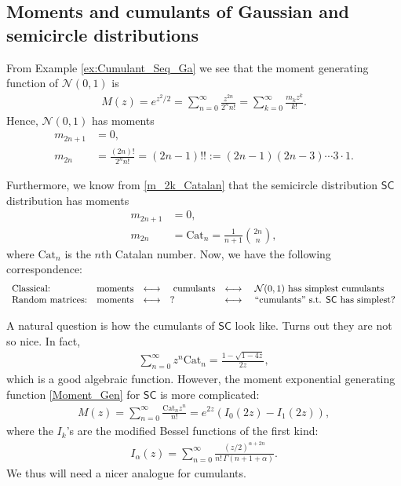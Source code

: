 \documentclass[letterpaper,11pt,oneside,reqno]{amsart}
\numberwithin{equation}{section}
\newcommand{\SC}{\mathsf{SC}}
\theoremstyle{definition}
\begin{document}

\subsection{Moments and cumulants of Gaussian and semicircle distributions} %
\label{sub:moments_and_cumulants_of_gaussian_and_semicircle_distributions}

From Example \ref{ex:Cumulant_Seq_Ga} we see that 
the moment generating function of $\mathcal{N}(0,1)$ is 
\begin{align*}
    M(z)=e^{z^2/2}=\sum_{n=0}^\infty \frac{z^{2n}}{2^nn!}=\sum_{k=0}^\infty \frac{m_k z^k}{k!}.
\end{align*}
Hence, $\mathcal{N}(0,1)$ has moments
\begin{align*}
    m_{2n+1} &=0,\\
    m_{2n}& = \frac{(2n)!}{2^nn!}=(2n-1)!!:=(2n-1)(2n-3)\cdots 3\cdot 1.
\end{align*}

Furthermore, we know from \eqref{m_2k_Catalan} that the semicircle distribution $\SC$ distribution has moments 
\begin{align*}
    m_{2n+1} &=0,\\
    m_{2n}& = \mathrm{Cat}_n=\frac{1}{n+1} {{2n}\choose{n}},
\end{align*}
where $\mathrm{Cat}_n$ is the $n$th Catalan number.
Now, we have the following correspondence:
\begin{equation*}
\begin{array}{llclcl}
\text{Classical:} &  \text{moments} & \longleftrightarrow &\  \text{cumulants} &\longleftrightarrow & \ \mathcal{N}(0,1) \ \text{has simplest cumulants}\\
\text{Random matrices:} & \text{moments} & \longleftrightarrow & ? &\longleftrightarrow &  \ \textnormal{``cumulants'' s.t. $\SC$ has simplest?}\\
\end{array}	
\end{equation*}

A natural question is how the cumulants of $\SC$ look like. Turns out they are not so nice. In fact, 
\begin{align*}
    \sum_{n=0}^\infty z^n \mathrm{Cat}_n=\frac{1-\sqrt{1-4z}}{2z},
\end{align*}
which is a good algebraic function. However, the moment exponential generating function
\eqref{Moment_Gen} 
for $\SC$ is more complicated:
\begin{align*}
    M(z)=\sum_{n=0}^\infty \frac{\mathrm{Cat}_nz^n}{n!}=e^{2z}(I_0(2z)-I_1(2z)),
\end{align*}
where the $I_k$'s are the modified Bessel functions of the first kind:
\begin{align*}
    I_\alpha(z)=\sum_{n=0}^\infty \frac{(z/2)^{\alpha+2n}}{n!\,\Gamma(n+1+\alpha)}.
\end{align*}
We thus will need a nicer analogue for cumulants.
\end{document}
